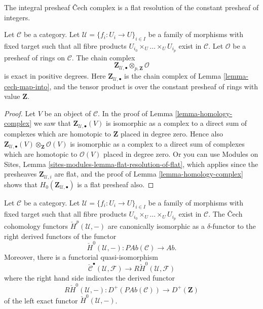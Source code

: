 \begin{lemma}
\label{lemma-complex-tensored-still-exact}
\begin{slogan}
The integral presheaf {\v C}ech complex is a flat resolution of the
constant presheaf of integers.
\end{slogan}
Let $\mathcal{C}$ be a category. Let
$\mathcal{U} = \{f_i : U_i \to U\}_{i \in I}$ be a family of morphisms
with fixed target such that all fibre products
$U_{i_0} \times_U \ldots \times_U U_{i_p}$ exist in $\mathcal{C}$.
Let $\mathcal{O}$ be a presheaf of rings on $\mathcal{C}$.
The chain complex
$$
\mathbf{Z}_{\mathcal{U}, \bullet}
\otimes_{p, \mathbf{Z}}
\mathcal{O}
$$
is exact in positive degrees. Here $\mathbf{Z}_{\mathcal{U}, \bullet}$
is the chain complex of Lemma \ref{lemma-cech-map-into}, and
the tensor product is over the constant presheaf of rings
with value $\mathbf{Z}$.
\end{lemma}

\begin{proof}
Let $V$ be an object of $\mathcal{C}$.
In the proof of Lemma \ref{lemma-homology-complex} we saw that
$\mathbf{Z}_{\mathcal{U}, \bullet}(V)$ is isomorphic as a complex
to a direct sum of complexes which are homotopic to $\mathbf{Z}$
placed in degree zero. Hence also
$\mathbf{Z}_{\mathcal{U}, \bullet}(V) \otimes_\mathbf{Z} \mathcal{O}(V)$
is isomorphic as a complex to a direct sum of complexes which are homotopic
to $\mathcal{O}(V)$ placed in degree zero.
Or you can use
Modules on Sites, Lemma \ref{sites-modules-lemma-flat-resolution-of-flat},
which applies since the presheaves $\mathbf{Z}_{\mathcal{U}, i}$ are flat,
and the proof of Lemma \ref{lemma-homology-complex} shows that
$H_0(\mathbf{Z}_{\mathcal{U}, \bullet})$ is a flat presheaf also.
\end{proof}

\begin{lemma}
\label{lemma-cech-cohomology-derived-presheaves}
Let $\mathcal{C}$ be a category. Let
$\mathcal{U} = \{f_i : U_i \to U\}_{i \in I}$ be a family of morphisms
with fixed target such that all fibre products
$U_{i_0} \times_U \ldots \times_U U_{i_p}$ exist in $\mathcal{C}$.
The {\v C}ech cohomology functors $\check{H}^p(\mathcal{U}, -)$
are canonically isomorphic as a $\delta$-functor to
the right derived functors of the functor
$$
\check{H}^0(\mathcal{U}, -) :
\textit{PAb}(\mathcal{C})
\longrightarrow
\textit{Ab}.
$$
Moreover, there is a functorial quasi-isomorphism
$$
\check{\mathcal{C}}^\bullet(\mathcal{U}, \mathcal{F})
\longrightarrow
R\check{H}^0(\mathcal{U}, \mathcal{F})
$$
where the right hand side indicates the derived functor
$$
R\check{H}^0(\mathcal{U}, -) :
D^{+}(\textit{PAb}(\mathcal{C}))
\longrightarrow
D^{+}(\mathbf{Z})
$$
of the left exact functor $\check{H}^0(\mathcal{U}, -)$.
\end{lemma}

